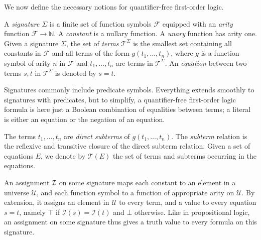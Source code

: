 \documentclass[smallextended]{svjour3}
\begin{document}
We now define the necessary notions for quantifier-free first-order logic.
\begin{definition}
A \emph{signature} $\Sigma$ is a finite set of function symbols $\mathcal{F}$
equipped with an \emph{arity} function $\mathcal{F} \rightarrow \mathbb{N}$.  A
\emph{constant} is a nullary function.  A \emph{unary} function has
arity one.  Given a signature $\Sigma$, the set of \emph{terms}
$\mathcal{T}^{\Sigma}$ is the smallest set containing all constants in
$\mathcal{F}$ and all terms of the form $g(t_1,\ldots, t_n)$, where $g$ is a
function symbol of arity $n$ in $\mathcal{F}$ and $t_1,\ldots,t_n$ are terms in $\mathcal{T}^{\Sigma}$.  An \emph{equation} between two terms $s,t$ in $\mathcal{T}^{\Sigma}$ is denoted by $s=t$.
\end{definition}
Signatures commonly include predicate symbols.  Everything extends smoothly to
signatures with predicates, but to simplify, a quantifier-free first-order logic
formula is here just a Boolean combination of equalities between terms; a
literal is either an equation or the negation of an equation.

The terms $t_1,\ldots,t_n$ are \emph{direct subterms} of $g(t_1,\ldots,t_n)$.  The \emph{subterm} relation is the reflexive and transitive closure of the direct subterm relation.
Given a set of equations $E$, we denote by $\mathcal{T}(E)$ the set of terms and subterms occurring in the equations.

An assignment ${\cal I}$ on some signature maps each constant to an element in a
universe $\mathcal{U}$, and each function symbol to a function of appropriate
arity on $\mathcal{U}$.  By extension, it assigns an element in $\mathcal{U}$ to
every term, and a value to every equation $s=t$, namely $\top$ if
$\mathcal{I}(s) = \mathcal{I}(t)$ and $\bot$ otherwise.  Like in propositional
logic, an assignment on some signature thus gives a truth value to every
formula on this signature.
\end{document}
